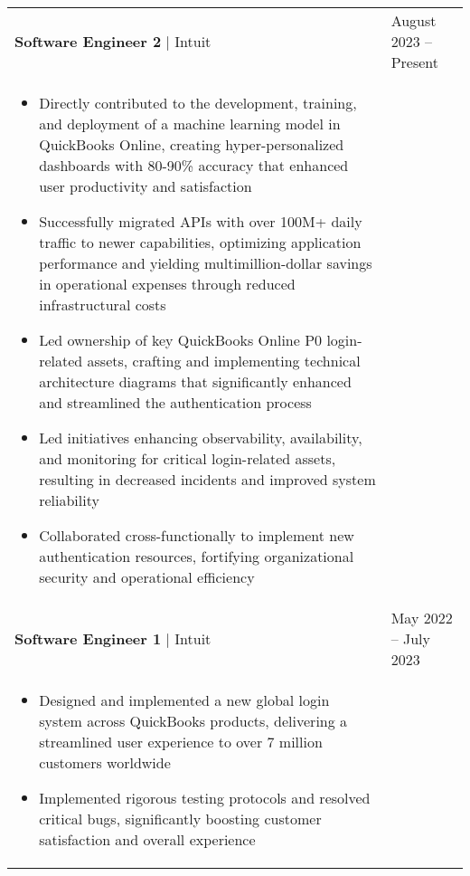 \documentclass[11pt]{article}
\newenvironment{compactList}
{
  \begin{itemize}
    \setlength{\itemsep}{0pt}
    \setlength{\parskip}{0pt}
}
{\end{itemize}}
\begin{document}
\begin{tabularx}{\textwidth\setlength{\extrarowheight}{5pt}}
  {
    >{\hsize=1.5\hsize\raggedright\arraybackslash}X
    >{\hsize=0.5\hsize\raggedleft\arraybackslash}X
  }
  \textbf{Software Engineer 2} $\vert$ Intuit                            & August 2023 – Present     \\
  \multicolumn{2}{>{\hsize=\dimexpr2\hsize+2\tabcolsep+\arrayrulewidth\relax}X}
  {
    \begin{minipage}{0.85\paperwidth}
      \begin{compactList}
        \item Directly contributed to the development, training, and deployment of a machine learning model in QuickBooks Online, creating hyper-personalized dashboards with 80-90\% accuracy that enhanced user productivity and satisfaction
        \item Successfully migrated APIs with over 100M+ daily traffic to newer capabilities, optimizing application performance and yielding multimillion-dollar savings in operational expenses through reduced infrastructural costs
        \item Led ownership of key QuickBooks Online P0 login-related assets, crafting and implementing technical architecture diagrams that significantly enhanced and streamlined the authentication process
        \item Led initiatives enhancing observability, availability, and monitoring for critical login-related assets, resulting in decreased incidents and improved system reliability
        \item Collaborated cross-functionally to implement new authentication resources, fortifying organizational security and operational efficiency
      \end{compactList}
    \end{minipage}
  }
  \\
  \textbf{Software Engineer 1} $\vert$ Intuit                            & May 2022 – July 2023     \\
  \multicolumn{2}{>{\hsize=\dimexpr2\hsize+2\tabcolsep+\arrayrulewidth\relax}X}
  {
    \begin{minipage}{0.85\paperwidth}
      \begin{compactList}
        \item Designed and implemented a new global login system across QuickBooks products, delivering a streamlined user experience to over 7 million customers worldwide
        \item Implemented rigorous testing protocols and resolved critical bugs, significantly boosting customer satisfaction and overall experience

\end{compactList}
\end{minipage}}
\end{tabularx}
\end{document}
